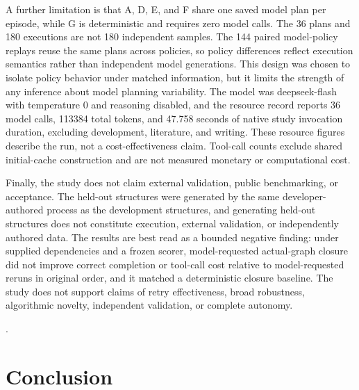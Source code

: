 \documentclass{article}
\begin{document}
A further limitation is that A, D, E, and F share one saved model plan per episode, while G is deterministic and requires zero model calls. The 36 plans and 180 executions are not 180 independent samples. The 144 paired model-policy replays reuse the same plans across policies, so policy differences reflect execution semantics rather than independent model generations. This design was chosen to isolate policy behavior under matched information, but it limits the strength of any inference about model planning variability. The model was deepseek-flash with temperature 0 and reasoning disabled, and the resource record reports 36 model calls, 113384 total tokens, and 47.758 seconds of native study invocation duration, excluding development, literature, and writing. These resource figures describe the run, not a cost-effectiveness claim. Tool-call counts exclude shared initial-cache construction and are not measured monetary or computational cost.

Finally, the study does not claim external validation, public benchmarking, or acceptance. The held-out structures were generated by the same developer-authored process as the development structures, and generating held-out structures does not constitute execution, external validation, or independently authored data. The results are best read as a bounded negative finding: under supplied dependencies and a frozen scorer, model-requested actual-graph closure did not improve correct completion or tool-call cost relative to model-requested reruns in original order, and it matched a deterministic closure baseline. The study does not support claims of retry effectiveness, broad robustness, algorithmic novelty, independent validation, or complete autonomy.

\citep{ref0001,ref0002,ref0003}.

\section{Conclusion}
\end{document}
